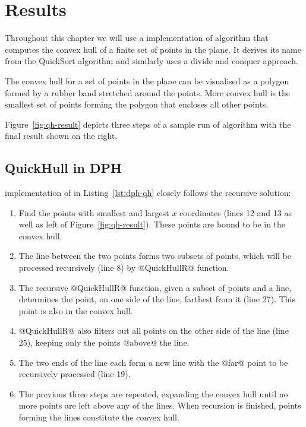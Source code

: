 \documentclass[preamble.tex]{subfiles}
\begin{document}
\clearpage

\chapter{Results}
\label{ch:results}
\label{sec:QuickHull}

Throughout this chapter we will use a  implementation of \QuickHull algorithm \cite{QuickHull} that computes the convex hull of a finite set of points in the plane. It derives its name from the QuickSort algorithm and similarly uses a divide and conquer approach.

The convex hull for a set of points in the plane can be visualised as a polygon formed by a rubber band stretched around the points. More convex hull is the smallest set of points forming the polygon that encloses all other points.

Figure~\ref{fig:qh-result} depicts three steps of a sample run of \QuickHull algorithm with the final result shown on the right.


\section{QuickHull in DPH}

 implementation of \QuickHull in Listing~\ref{lst:dph-qh} closely follows the recursive solution:
\begin{enumerate}
  \item Find the points with smallest and largest $x$ coordinates (lines 12 and 13 as well as left of Figure~\ref{fig:qh-result}). These points are bound to be in the convex hull.

  \item The line between the two points forms two subsets of points, which will be processed recursively (line 8) by @QuickHullR@ function.

  \item The recursive @QuickHullR@ function, given a subset of points and a line, determines the point, on one side of the line, farthest from it (line 27). This point is also in the convex hull.

  \item @QuickHullR@ also filters out all points on the other side of the line (line 25), keeping only the points @above@ the line.

  \item The two ends of the line each form a new line with the @far@ point to be recursively processed (line 19).

  \item The previous three steps are repeated, expanding the convex hull until no more points are left above any of the lines. When recursion is finished, points forming the lines constitute the convex hull.
\end{enumerate}
\end{document}
